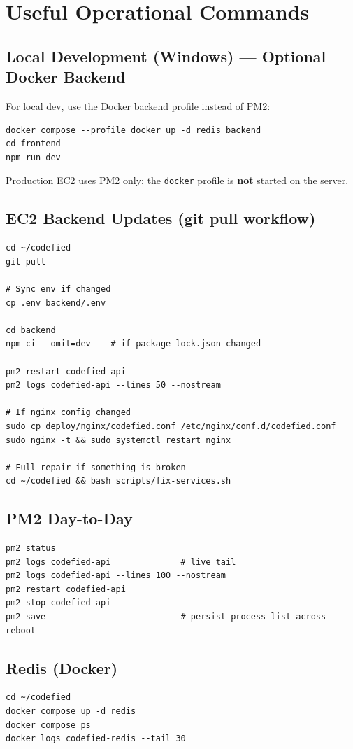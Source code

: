 \documentclass[11pt,a4paper]{article}
\begin{document}
\section{Useful Operational Commands}

\subsection{Local Development (Windows) --- Optional Docker Backend}
For local dev, use the Docker backend profile instead of PM2:
\begin{lstlisting}[style=terminal]
docker compose --profile docker up -d redis backend
cd frontend
npm run dev
\end{lstlisting}

Production EC2 uses PM2 only; the \texttt{docker} profile is \textbf{not} started on the server.

\subsection{EC2 Backend Updates (git pull workflow)}
\begin{lstlisting}[style=terminal]
cd ~/codefied
git pull

# Sync env if changed
cp .env backend/.env

cd backend
npm ci --omit=dev    # if package-lock.json changed

pm2 restart codefied-api
pm2 logs codefied-api --lines 50 --nostream

# If nginx config changed
sudo cp deploy/nginx/codefied.conf /etc/nginx/conf.d/codefied.conf
sudo nginx -t && sudo systemctl restart nginx

# Full repair if something is broken
cd ~/codefied && bash scripts/fix-services.sh
\end{lstlisting}

\subsection{PM2 Day-to-Day}
\begin{lstlisting}[style=terminal]
pm2 status
pm2 logs codefied-api              # live tail
pm2 logs codefied-api --lines 100 --nostream
pm2 restart codefied-api
pm2 stop codefied-api
pm2 save                           # persist process list across reboot
\end{lstlisting}

\subsection{Redis (Docker)}
\begin{lstlisting}[style=terminal]
cd ~/codefied
docker compose up -d redis
docker compose ps
docker logs codefied-redis --tail 30
\end{lstlisting}
\end{document}
